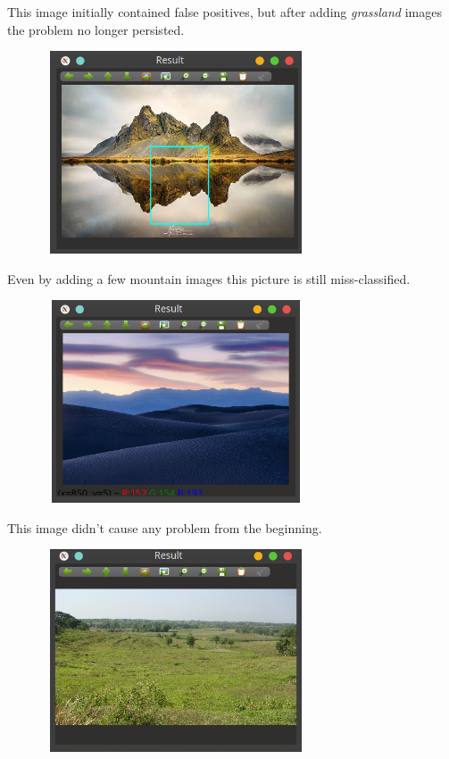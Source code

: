 \documentclass[]{report}
\begin{document}
This image initially contained false positives, but after adding \textit{grassland} images the problem no longer persisted.

\vspace{0.5cm}
\begin{center}
	\includegraphics[width=10cm,height=6cm]{img/final/7}
\end{center}
\vspace{0.5cm}

Even by adding a few mountain images this picture is still miss-classified.

\vspace{0.5cm}
\begin{center}
	\includegraphics[width=10cm,height=6cm]{img/final/8}
\end{center}
\vspace{0.5cm}

This image didn't cause any problem from the beginning.

\vspace{0.5cm}
\begin{center}
	\includegraphics[width=10cm,height=6cm]{img/final/9}
\end{center}
\vspace{0.5cm}
\end{document}
